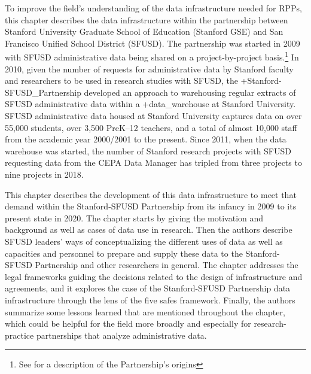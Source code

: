 \documentclass[
]{WileySix}
\begin{document}
To improve the field's understanding of the data infrastructure needed for RPPs, this chapter describes the data infrastructure within the partnership between Stanford University Graduate School of Education (Stanford GSE) and San Francisco Unified School District (SFUSD). The partnership was started in 2009 with SFUSD administrative data being shared on a project-by-project basis.\footnote{See \citet{wentworth2016} for a description of the Partnership's origins} In 2010, given the number of requests for administrative data by Stanford faculty and researchers to be used in research studies with SFUSD, the +Stanford-SFUSD\_Partnership\textbar{} developed an approach to warehousing regular extracts of SFUSD administrative data within a +data\_warehouse\textbar{} at Stanford University. SFUSD administrative data housed at Stanford University captures data on over 55,000 students, over 3,500 PreK--12 teachers, and a total of almost 10,000 staff from the academic year 2000/2001 to the present. Since 2011, when the data warehouse was started, the number of Stanford research projects with SFUSD requesting data from the CEPA Data Manager has tripled from three projects to nine projects in 2018.

This chapter describes the development of this data infrastructure to meet that demand within the Stanford-SFUSD Partnership from its infancy in 2009 to its present state in 2020. The chapter starts by giving the motivation and background as well as cases of data use in research. Then the authors describe SFUSD leaders' ways of conceptualizing the different uses of data as well as capacities and personnel to prepare and supply these data to the Stanford-SFUSD Partnership and other researchers in general. The chapter addresses the legal frameworks guiding the decisions related to the design of infrastructure and agreements, and it explores the case of the Stanford-SFUSD Partnership data infrastructure through the lens of the five safes framework. Finally, the authors summarize some lessons learned that are mentioned throughout the chapter, which could be helpful for the field more broadly and especially for research-practice partnerships that analyze administrative data.
\end{document}
